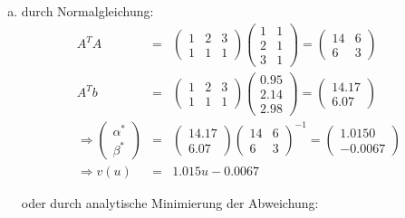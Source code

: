\documentclass[11pt]{article} %
\begin{document}
\begin{enumerate}[a)]
\item durch Normalgleichung:
\begin{eqnarray*}
A^TA  &=& \begin{pmatrix}1 & 2 & 3 \\ 1 & 1 & 1\end{pmatrix} \begin{pmatrix} 1 & 1 \\ 2 & 1 \\ 3 & 1 \end{pmatrix} = \begin{pmatrix} 14 & 6 \\ 6 & 3 \end{pmatrix} \\
A^Tb &=& \begin{pmatrix}1 & 2 & 3 \\ 1 & 1 & 1\end{pmatrix} \begin{pmatrix} 0.95 \\ 2.14 \\ 2.98 \end{pmatrix} = \begin{pmatrix} 14.17 \\ 6.07\end{pmatrix} \\
\Rightarrow \begin{pmatrix} \alpha^* \\ \beta^* \end{pmatrix} &=& \begin{pmatrix} 14.17 \\ 6.07 \end{pmatrix} \begin{pmatrix} 14 & 6 \\ 6 & 3 \end{pmatrix}^{-1} = \begin{pmatrix} 1.0150 \\ -0.0067 \end{pmatrix} \\
\Rightarrow v(u) &=& 1.015u - 0.0067
\end{eqnarray*}

oder durch analytische Minimierung der Abweichung:


\end{enumerate}
\end{document}
